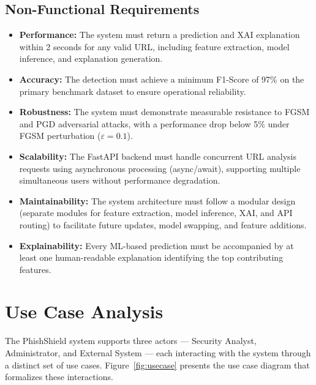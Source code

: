\subsection{Non-Functional Requirements}

\begin{itemize}
    \item \textbf{Performance:} The system must return a prediction and XAI explanation within 2 seconds for any valid URL, including feature extraction, model inference, and explanation generation.
    \item \textbf{Accuracy:} The detection must achieve a minimum F1-Score of 97\% on the primary benchmark dataset to ensure operational reliability.
    \item \textbf{Robustness:} The system must demonstrate measurable resistance to FGSM and PGD adversarial attacks, with a performance drop below 5\% under FGSM perturbation ($\varepsilon = 0.1$).
    \item \textbf{Scalability:} The FastAPI backend must handle concurrent URL analysis requests using asynchronous processing (async/await), supporting multiple simultaneous users without performance degradation.
    \item \textbf{Maintainability:} The system architecture must follow a modular design (separate modules for feature extraction, model inference, XAI, and API routing) to facilitate future updates, model swapping, and feature additions.
    \item \textbf{Explainability:} Every ML-based prediction must be accompanied by at least one human-readable explanation identifying the top contributing features.
\end{itemize}

\section{Use Case Analysis}

The PhishShield system supports three actors — Security Analyst, Administrator, and External System — each interacting with the system through a distinct set of use cases. Figure~\ref{fig:usecase} presents the use case diagram that formalizes these interactions.

